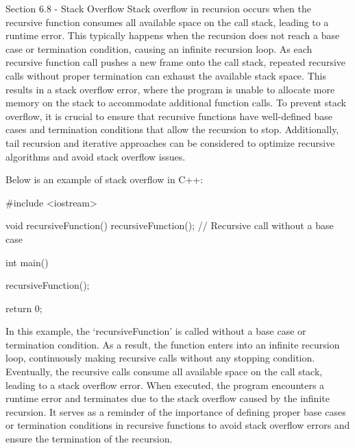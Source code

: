 \begin{notes}{Section 6.8 - Stack Overflow}
    Stack overflow in recursion occurs when the recursive function consumes all available space on the call stack, leading to a runtime error. This typically happens when the recursion does not reach a base case or termination condition, causing an infinite recursion loop. As each recursive function call pushes a new frame onto the 
    call stack, repeated recursive calls without proper termination can exhaust the available stack space. This results in a stack overflow error, where the program is unable to allocate more memory on the stack to accommodate additional function calls. To prevent stack overflow, it is crucial to ensure that recursive functions have 
    well-defined base cases and termination conditions that allow the recursion to stop. Additionally, tail recursion and iterative approaches can be considered to optimize recursive algorithms and avoid stack overflow issues.
    
    \begin{highlight}
        Below is an example of stack overflow in C++:
    
    \begin{code}[C++]
    #include <iostream>

    void recursiveFunction() {
        recursiveFunction();  // Recursive call without a base case
    }
    
    int main() {
        recursiveFunction();
    
        return 0;
    }
    \end{code}
        In this example, the `recursiveFunction' is called without a base case or termination condition. As a result, the function enters into an infinite recursion loop, continuously making recursive calls without any stopping condition. Eventually, the recursive calls consume all available space on the call stack, leading to a stack 
        overflow error. When executed, the program encounters a runtime error and terminates due to the stack overflow caused by the infinite recursion. It serves as a reminder of the importance of defining proper base cases or termination conditions in recursive functions to avoid stack overflow errors and ensure the termination of the recursion.
    \end{highlight}
\end{notes}

